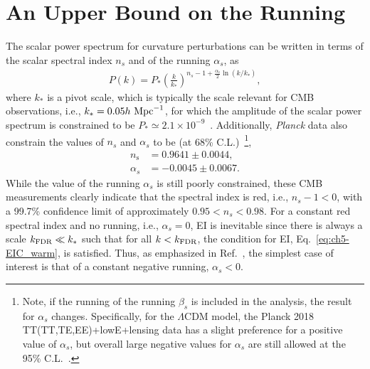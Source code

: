 \section{An Upper Bound on the Running}
\label{sec:ch5-upper}

The scalar power spectrum for curvature perturbations can be written
in terms of the scalar spectral index $n_s$ and of the running
$\alpha_s$, as
%
\begin{eqnarray}    P(k)=P_*\left(\frac{k}{k_*}\right)^{n_s-1+\frac{\alpha_s}{2}
    \ln(k/k_*)},
\end{eqnarray}
%
where $k_*$ is a pivot scale, which is typically the scale relevant
for CMB observations, i.e., $k_*=0.05h~\rm{Mpc}^{-1}$, for which the
amplitude of the scalar power spectrum is constrained to be $P_*\simeq
2.1 \times 10^{-9}$~\cite{Planck:2018vyg}. Additionally,
\textit{Planck} data also constrain the values of $n_s$ and $\alpha_s$
to be (at 68\% C.L.)~\cite{Planck:2018jri}\footnote{ Note, if the
running of the running $\beta_s$ is included in the analysis, the
result for $\alpha_s$ changes. Specifically, for the $\Lambda$CDM
model, the Planck 2018 TT(TT,TE,EE)+lowE+lensing  data has a slight
preference for a positive value of $\alpha_s$, but overall large
negative values for $\alpha_s$ are still allowed at the 95\%
C.L.~\cite{Planck:2018jri}.},
%
     \begin{align}
n_{\mathrm{s}} & =0.9641 \pm 0.0044, \\ \alpha_s & =-0.0045 \pm
0.0067. \label{eq:ch5-Planck_alphaS}
     \end{align}
%
While the value of the running $\alpha_s$ is still poorly constrained,
these CMB measurements clearly indicate that the spectral index is
red, i.e., $n_s-1<0$, with a 99.7\% confidence limit of approximately
$0.95<n_s<0.98$. {}For a constant red spectral index and no running,
i.e., $\alpha_s=0$, EI is inevitable since there is always a scale
$k_{\rm{FDR}}\ll k_*$ such that for all $k<k_{\rm{FDR}}$, the
condition for EI, Eq.~\ref{eq:ch5-EIC_warm}, is satisfied.  Thus, as
emphasized in Ref.~\cite{Kinney:2014jya}, the simplest case of
interest is that of a constant negative running, $\alpha_s<0$.

